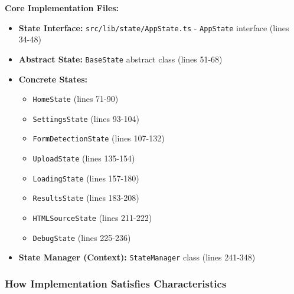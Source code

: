 \documentclass[11pt]{article}
\begin{document}
\textbf{Core Implementation Files:}
\begin{itemize}[noitemsep]
    \item \textbf{State Interface:} \texttt{src/lib/state/AppState.ts} - \texttt{AppState} interface (lines 34-48)
    \item \textbf{Abstract State:} \texttt{BaseState} abstract class (lines 51-68)
    \item \textbf{Concrete States:}
    \begin{itemize}[noitemsep]
        \item \texttt{HomeState} (lines 71-90)
        \item \texttt{SettingsState} (lines 93-104)
        \item \texttt{FormDetectionState} (lines 107-132)
        \item \texttt{UploadState} (lines 135-154)
        \item \texttt{LoadingState} (lines 157-180)
        \item \texttt{ResultsState} (lines 183-208)
        \item \texttt{HTMLSourceState} (lines 211-222)
        \item \texttt{DebugState} (lines 225-236)
    \end{itemize}
    \item \textbf{State Manager (Context):} \texttt{StateManager} class (lines 241-348)
\end{itemize}

\subsubsection{How Implementation Satisfies Characteristics}
\end{document}
